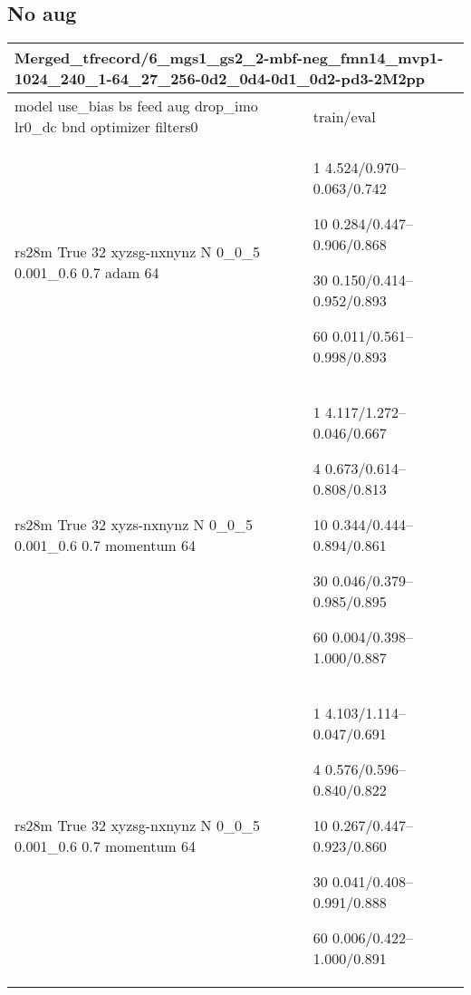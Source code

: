 \documentclass[,table,dvipsnames]{article}
\begin{document}
\subsection{No aug}
\noindent\begin{tabular}{|p{10cm}|p{5cm}| }	
	\hline
	\multicolumn{2}{|p{15cm}|}{Merged\_tfrecord/6\_mgs1\_gs2\_2-mbf-neg\_fmn14\_mvp1-1024\_240\_1-64\_27\_256-0d2\_0d4-0d1\_0d2-pd3-2M2pp}\\
	\hline
	model use\_bias bs feed aug drop\_imo lr0\_dc bnd optimizer filters0 & train/eval \\
	
	\rowcolor{red!20}
	rs28m True 32 xyzsg-nxnynz N 0\_0\_5 0.001\_0.6 0.7 adam 64&
	1 4.524/0.970--0.063/0.742\par 10 0.284/0.447--0.906/0.868\par 30 0.150/0.414--0.952/0.893\par 60 0.011/0.561--0.998/0.893 \\
	
	\rowcolor{blue!20}
	rs28m True 32 xyzs-nxnynz N 0\_0\_5 0.001\_0.6 0.7 momentum 64&
	1 4.117/1.272--0.046/0.667\par 4 0.673/0.614--0.808/0.813\par 10 0.344/0.444--0.894/0.861\par 30 0.046/0.379--0.985/0.895\par 60 0.004/0.398--1.000/0.887\\
	
	\rowcolor{yellow!20}
	rs28m True 32 xyzsg-nxnynz N 0\_0\_5 0.001\_0.6 0.7 momentum 64&
	1 4.103/1.114--0.047/0.691\par 4 0.576/0.596--0.840/0.822\par 10 0.267/0.447--0.923/0.860\par  30 0.041/0.408--0.991/0.888\par 60 0.006/0.422--1.000/0.891\\
	
	
	\hline 
\end{tabular}
\end{document}
